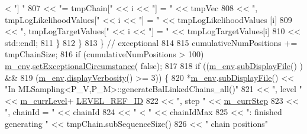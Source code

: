 \begin{DoxyCode}
      < \textcolor{stringliteral}{"] "}
807                                     << \textcolor{stringliteral}{"= tmpChain["}               << i << \textcolor{stringliteral}{"] = "} << tmpVec
808                                     << \textcolor{stringliteral}{", tmpLogLikelihoodValues["} << i << \textcolor{stringliteral}{"] = "} << tmpLogLikelihoodValues
      [i]
809                                     << \textcolor{stringliteral}{", tmpLogTargetValues["}     << i << \textcolor{stringliteral}{"] = "} << tmpLogTargetValues[i]
810                                     << std::endl;
811           \}
812         \}
813       \} \textcolor{comment}{// exceptional}
814 
815       cumulativeNumPositions += tmpChainSize;
816       \textcolor{keywordflow}{if} (cumulativeNumPositions > 100) \hyperlink{class_q_u_e_s_o_1_1_m_l_sampling_a13f1ca4fe9f94822fe572a743eaced1d}{m\_env}.\hyperlink{class_q_u_e_s_o_1_1_base_environment_abb2a6a8de19058957f856341fce2440e}{setExceptionalCircumstance}(\textcolor{keyword}{
      false});
817 
818       \textcolor{keywordflow}{if} ((\hyperlink{class_q_u_e_s_o_1_1_m_l_sampling_a13f1ca4fe9f94822fe572a743eaced1d}{m\_env}.\hyperlink{class_q_u_e_s_o_1_1_base_environment_a8a0064746ae8dddfece4229b9ad374d6}{subDisplayFile}()       ) &&
819           (\hyperlink{class_q_u_e_s_o_1_1_m_l_sampling_a13f1ca4fe9f94822fe572a743eaced1d}{m\_env}.\hyperlink{class_q_u_e_s_o_1_1_base_environment_a1fe5f244fc0316a0ab3e37463f108b96}{displayVerbosity}() >= 3)) \{
820         *\hyperlink{class_q_u_e_s_o_1_1_m_l_sampling_a13f1ca4fe9f94822fe572a743eaced1d}{m\_env}.\hyperlink{class_q_u_e_s_o_1_1_base_environment_a8a0064746ae8dddfece4229b9ad374d6}{subDisplayFile}() << \textcolor{stringliteral}{"In
       MLSampling<P\_V,P\_M>::generateBalLinkedChains\_all()"}
821                                 << \textcolor{stringliteral}{", level "}               << \hyperlink{class_q_u_e_s_o_1_1_m_l_sampling_af9416874c856e50f3b35270e801f17e4}{m\_currLevel}+
      \hyperlink{_m_l_sampling_level_options_8h_a68d15eaf394d210effcf584b938206d3}{LEVEL\_REF\_ID}
822                                 << \textcolor{stringliteral}{", step "}                << \hyperlink{class_q_u_e_s_o_1_1_m_l_sampling_a1b1f8ccb4823bdfa26ec652f0807c63e}{m\_currStep}
823                                 << \textcolor{stringliteral}{", chainId = "}           << chainId
824                                 << \textcolor{stringliteral}{" < "}                    << chainIdMax
825                                 << \textcolor{stringliteral}{": finished generating "} << tmpChain.subSequenceSize()
826                                 << \textcolor{stringliteral}{" chain positions"}

\end{DoxyCode}
